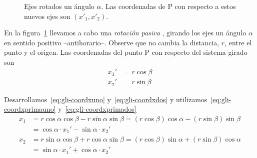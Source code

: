 \begin{figure}[ht]
\begin{minipage}{0.45\linewidth}
    \caption{Ejes rotados un ángulo $\alpha$. Las coordenadas de P con respecto a estos nuevos ejes son $(x'_1,x'_2)$.}
    \label{fig:gli-rotated_axes}
  \end{minipage}
\end{figure}

En la figura~\ref{fig:gli-rotated_axes} llevamos a cabo una \emph{rotación pasiva} \footnotemark{}, girando los ejes un ángulo $\alpha$ en sentido positivo --antihorario--.
Observe que no cambia la distancia, $r$, entre el punto y el origen.
Las coordenadas del punto P con respecto del sistema girado son
\begin{subequations}
  \begin{align}\label{eq:gli-coordxprimauno}
    x_1' &= r \cos\beta\\
    \label{eq:gli-coordxprimados}
    x_2' &= r \sin\beta
  \end{align}
\end{subequations}

Desarrollamos~\eqref{eq:gli-coordxuno} y~\eqref{eq:gli-coordxdos} y  utilizamos~\eqref{eq:gli-coordxprimauno} y~\eqref{eq:gli-coordxprimados}
\begin{align*}
  x_1 &= r \cos\alpha \cos\beta - r \sin\alpha \sin\beta
        = (r\cos\beta)\cos\alpha - (r\sin\beta)\sin\beta\\
        &= \cos\alpha\cdot x_1' - \sin\alpha \cdot x_2'\\
  x_2 &= r \sin\alpha \cos\beta + r \cos\alpha \sin\beta
        = (r \cos\beta)\sin\alpha + (r \sin\beta)\cos\alpha\\
        &= \sin\alpha \cdot x_1' + \cos\alpha \cdot  x_2'
\end{align*}

